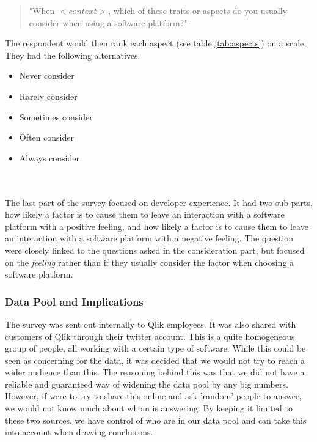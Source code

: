 \documentclass{cslthse-msc}
\begin{document}
    \begin{quote}
        "When $<context>$, which of these traits or aspects do you usually consider when using a software platform?"
    \end{quote}
    The respondent would then rank each aspect (see table \ref{tab:aspects}) on a scale. They had the following alternatives.
    \begin{itemize}[label={-}]
        \item Never consider
        \item Rarely consider
        \item Sometimes consider
        \item Often consider
        \item Always consider
    \end{itemize}
    \\ \\
    The last part of the survey focused on developer experience. It had
    two sub-parts, how likely a factor is to cause them to leave an
    interaction with a software platform with a positive feeling, and how
    likely a factor is to cause them to leave an interaction with a software
    platform with a negative feeling. The question were closely linked to
    the questions asked in the consideration part, but focused on the
    \textit{feeling} rather than if they usually consider the factor when choosing
    a software platform.

    \subsubsection{Data Pool and Implications}
    The survey was sent out internally to Qlik employees. It was also shared with customers of Qlik through their twitter account. This is a quite homogeneous group of people, all working with a certain type of software. While this could be seen as concerning for the data, it was decided that we would not try to reach a wider audience than this. The reasoning behind this was that we did not have a reliable and guaranteed way of widening the data pool by any big numbers. However, if were to try to share this online and ask 'random' people to answer, we would not know much about whom is answering. By keeping it limited to these two sources, we have control of who are in our data pool and can take this into account when drawing conclusions.
\end{document}
